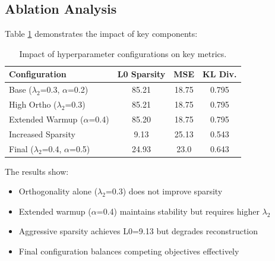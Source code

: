 \documentclass{article} %
\begin{document}
\subsection{Ablation Analysis}
Table \ref{tab:ablation} demonstrates the impact of key components:

\begin{table}[h]
\centering
\begin{tabular}{lccc}
\toprule
Configuration & L0 Sparsity & MSE & KL Div. \\
\midrule
Base ($\lambda_2$=0.3, $\alpha$=0.2) & 85.21 & 18.75 & 0.795 \\
High Ortho ($\lambda_2$=0.3) & 85.21 & 18.75 & 0.795 \\
Extended Warmup ($\alpha$=0.4) & 85.20 & 18.75 & 0.795 \\
Increased Sparsity & 9.13 & 25.13 & 0.543 \\
Final ($\lambda_2$=0.4, $\alpha$=0.5) & 24.93 & 23.0 & 0.643 \\
\bottomrule
\end{tabular}
\caption{Impact of hyperparameter configurations on key metrics.}
\label{tab:ablation}
\end{table}

The results show:
\begin{itemize}
\item Orthogonality alone ($\lambda_2$=0.3) does not improve sparsity
\item Extended warmup ($\alpha$=0.4) maintains stability but requires higher $\lambda_2$
\item Aggressive sparsity achieves L0=9.13 but degrades reconstruction
\item Final configuration balances competing objectives effectively
\end{itemize}
\end{document}
